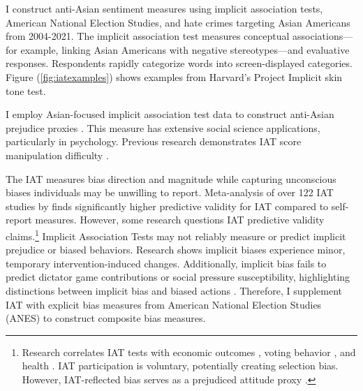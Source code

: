 I construct anti-Asian sentiment measures using implicit association tests, American National Election Studies, and hate crimes targeting Asian Americans from 2004-2021. The implicit association test measures conceptual associations—for example, linking Asian Americans with negative stereotypes—and evaluative responses. Respondents rapidly categorize words into screen-displayed categories. Figure (\ref{fig:iatexamples}) shows examples from Harvard's Project Implicit skin tone test.

I employ Asian-focused implicit association test data to construct anti-Asian prejudice proxies \autocite{greenwaldMeasuringIndividualDifferences1998}. This measure has extensive social science applications, particularly in psychology. Previous research demonstrates IAT score manipulation difficulty \autocite{egloffPredictiveValidityImplicit2002}.

The IAT measures bias direction and magnitude while capturing unconscious biases individuals may be unwilling to report. Meta-analysis of over 122 IAT studies by \textcite{greenwaldMeasuringIndividualDifferences1998} finds significantly higher predictive validity for IAT compared to self-report measures. However, some research questions IAT predictive validity claims.\footnote{Research correlates IAT tests with economic outcomes \autocite{chettyRaceEconomicOpportunity2020,gloverDiscriminationSelfFulfillingProphecy2017}, voting behavior \autocite{friesePredictingVotingBehavior2007}, and health \autocite{leitnerRacialBiasAssociated2016}. IAT participation is voluntary, potentially creating selection bias. However, IAT-reflected bias serves as a prejudiced attitude proxy \autocite{chettyRaceEconomicOpportunity2020}.} Implicit Association Tests may not reliably measure or predict implicit prejudice or biased behaviors. Research shows implicit biases experience minor, temporary intervention-induced changes. Additionally, implicit bias fails to predict dictator game contributions or social pressure susceptibility, highlighting distinctions between implicit bias and biased actions \autocite{arkesAttributionsImplicitPrejudice2004,forscherMetaanalysisProceduresChange2019,leeDoesImplicitBias2018}. Therefore, I supplement IAT with explicit bias measures from American National Election Studies (ANES) to construct composite bias measures.


